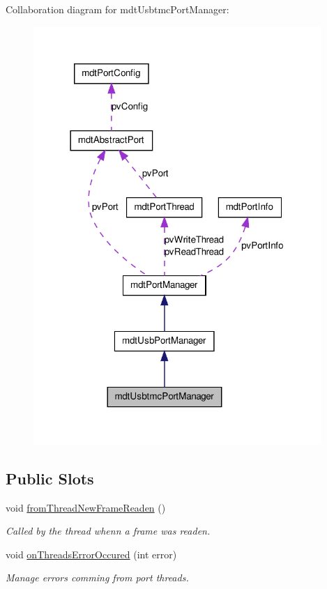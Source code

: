 Collaboration diagram for mdtUsbtmcPortManager:
\nopagebreak
\begin{figure}[H]
\begin{center}
\leavevmode
\includegraphics[width=310pt]{classmdt_usbtmc_port_manager__coll__graph}
\end{center}
\end{figure}
\subsection*{Public Slots}
\begin{DoxyCompactItemize}
\item 
void \hyperlink{classmdt_usbtmc_port_manager_aca42b343ae1f6a324e6e45968f03bbea}{fromThreadNewFrameReaden} ()
\begin{DoxyCompactList}\small\item\em Called by the thread whenn a frame was readen. \end{DoxyCompactList}\item 
\hypertarget{classmdt_usbtmc_port_manager_aa2e58a1ba341ff9f984aaef16fd665db}{
void \hyperlink{classmdt_usbtmc_port_manager_aa2e58a1ba341ff9f984aaef16fd665db}{onThreadsErrorOccured} (int error)}
\label{classmdt_usbtmc_port_manager_aa2e58a1ba341ff9f984aaef16fd665db}

\begin{DoxyCompactList}\small\item\em Manage errors comming from port threads. \end{DoxyCompactList}\end{DoxyCompactItemize}
